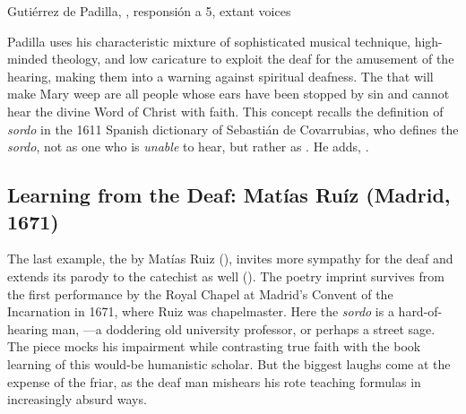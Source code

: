 \begin{musicexample}
    \caption{Gutiérrez de Padilla, ,
    responsión a 5, extant voices}

    \label{music:Padilla-Sordo-responsion}

\end{musicexample}

Padilla uses his characteristic mixture of sophisticated musical technique,
high-minded theology, and low caricature to exploit the deaf for the amusement
of the hearing, making them into a warning against spiritual deafness.
The  that will make Mary weep are all people whose ears have
been stopped by sin and cannot hear the divine Word of Christ with faith.
This concept recalls the definition of \emph{sordo} in the 1611 Spanish
dictionary of Sebastián de Covarrubias, who defines the \emph{sordo}, not as one
who is \emph{unable} to hear, but rather as .
He adds, .%
    \Autocite
    [: .] 
    {Covarrubias:Tesoro}


\subsection{Learning from the Deaf: Matías Ruíz (Madrid, 1671)}

The last example, the  by Matías Ruiz
(), invites more sympathy for the deaf and extends its
parody to the catechist as well
().
The poetry imprint survives from the first performance by the Royal Chapel at
Madrid's Convent of the Incarnation in 1671, where Ruiz was chapelmaster.%
   \Autocites{1671-Madrid-Enc-Nav}{Grove:Ruiz}
Here the \emph{sordo} is a hard-of-hearing man, ---a doddering old university professor, or perhaps a street sage.
The piece mocks his impairment while contrasting true faith with the book
learning of this would-be humanistic scholar.
But the biggest laughs come at the expense of the friar, as the deaf man
mishears his rote teaching formulas in increasingly absurd ways.

